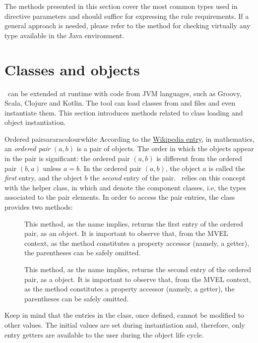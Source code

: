 The methods presented in this section cover the most common types used in directive parameters and should suffice for expressing the rule requirements. If a general approach is needed, please refer to the  method for checking virtually any type available in the Java environment.

\section{Classes and objects}
\label{sec:classesandobjects}

\arara\ can be extended at runtime with code from JVM languages, such as Groovy, Scala, Clojure and Kotlin. The tool can load classes from  and  files and even instantiate them. This section introduces methods related to class loading and object instantiation.

\begin{messagebox}{Ordered pairs}{araracolour}{\icok}{white}
According to the \href{https://en.wikipedia.org/wiki/Ordered_pair}{Wikipedia entry}, in mathematics, an \emph{ordered pair} $(a, b)$ is a pair of objects. The order in which the objects appear in the pair is significant: the ordered pair $(a, b)$ is different from the ordered pair $(b, a)$ unless $a = b$. In the ordered pair $(a, b)$, the object $a$ is called the \emph{first} entry, and the object $b$ the \emph{second} entry of the pair. \arara\ relies on this concept with the helper  class, in which  and  denote the component classes, i.e, the types associated to the pair elements. In order to access the pair entries, the class provides two methods:

\begin{description}
\item[\hfill{}] This method, as the name implies, returns the first entry of the ordered pair, as an  object. It is important to observe that, from the MVEL context, as the method constitutes a property accessor (namely, a getter), the parentheses can be safely omitted.

\item[\hfill{}] This method, as the name implies, returns the second entry of the ordered pair, as a  object. It is important to observe that, from the MVEL context, as the method constitutes a property accessor (namely, a getter), the parentheses can be safely omitted.
\end{description}

Keep in mind that the entries in the  class, once defined, cannot be modified to other values. The initial values are set during instantiation and, therefore, only entry getters are available to the user during the object life cycle.
\end{messagebox}

